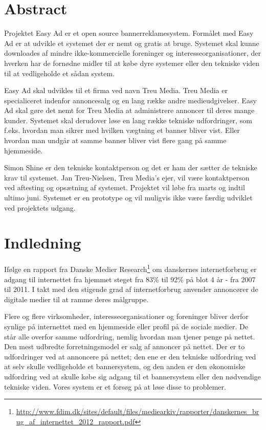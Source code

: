 \documentclass[a4paper,12pt]{article}
\begin{document}
\section{Abstract}

Projektet Easy Ad er et open source bannerreklamesystem. Formålet med Easy Ad er at udvikle et systemet der er nemt og gratis at bruge. Systemet skal kunne downloades af mindre ikke-kommercielle foreninger og interesseorganisationer, der hverken har de fornødne midler til at købe dyre systemer eller den tekniske viden til at vedligeholde et sådan system.

Easy Ad skal udvikles til et firma ved navn Treu Media. Treu Media er specialiceret indenfor annoncesalg og en lang række andre medieudgivelser. Easy Ad skal gøre det nemt for Treu Media at administrere annoncer til deres mange kunder. Systemet skal derudover løse en lang række tekniske udfordringer, som f.eks. hvordan man sikrer med hvilken vægtning et banner bliver vist. Eller hvordan man undgår at samme banner bliver vist flere gang på samme hjemmeside.

Simon Shine er den tekniske kontaktperson og det er ham der sætter de tekniske krav til systemet. Jan Treu-Nielsen, Treu Media's ejer, vil være kontaktperson ved aftesting og opsætning af systemet. Projektet vil løbe fra marts og indtil ultimo juni. Systemet er en prototype og vil muligvis ikke være færdig udviklet ved projektets udgang. 

\newpage


\section{Indledning}
Ifølge en rapport fra Danske Medier Research\footnote{\url{ http://www.fdim.dk/sites/default/files/mediearkiv/rapporter/danskernes\_brug\_af\_internettet\_2012\_rapport.pdf}} om danskernes internetforbrug er adgang til internettet fra hjemmet steget fra 83\% til 92\% på blot 4 år - fra 2007 til 2011. I takt med den stigende grad af internetforbrug anvender annoncører de digitale medier til at ramme deres målgruppe.

Flere og flere virksomheder, interesseorganisationer og foreninger bliver derfor synlige på internettet med en hjemmeside eller profil på de sociale medier. De står alle overfor samme udfordring, nemlig hvordan man tjener penge på nettet. Den mest udbredte forretningsmodel er salg af annoncer på nettet. Der er to udfordringer ved at annoncere på nettet; den ene er den tekniske udfordring ved at selv skulle vedligeholde et bannersystem, og den anden er den økonomiske udfordring ved at skulle købe sig adgang til et bannersystem eller den nødvendige tekniske viden. Vores system er et forsøg på at løse disse to problemer.
\end{document}
